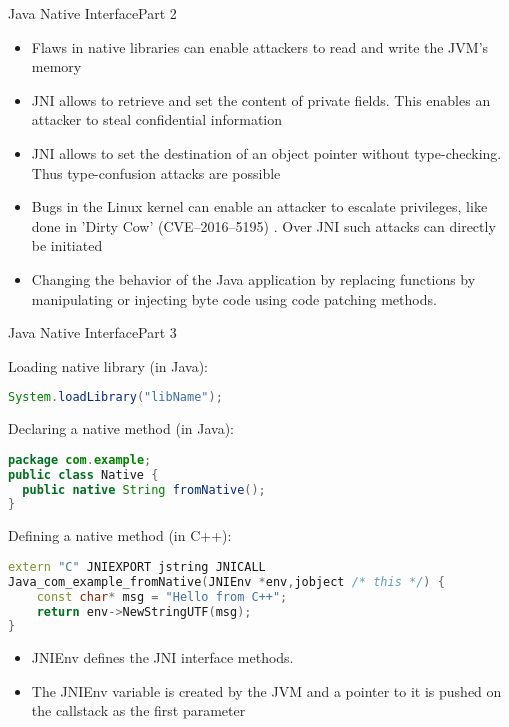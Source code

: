 \begin{frame}{Java Native Interface}{Part 2}
    \begin{itemize}
    \item Flaws in native libraries can enable attackers to read and write the JVM's memory \cite[p. 3]{Sun_jvm-portablesandboxing}
    \item JNI allows to retrieve and set the content of private fields. This enables an attacker to steal confidential information \cite[p. 3]{Sun_jvm-portablesandboxing}
    \item JNI allows to set the destination of an object pointer without type-checking. Thus type-confusion attacks are possible \cite[p. 4]{Sun_jvm-portablesandboxing}
    \item Bugs in the Linux kernel can enable an attacker to escalate privileges, like done in 'Dirty Cow' (CVE--2016--5195) \cite{DirtyCow}. Over JNI such attacks can directly be initiated
    \item Changing the behavior of the Java application by replacing functions by manipulating or injecting byte code using code patching methods.
    \end{itemize}
\end{frame}



\begin{frame}[fragile]{Java Native Interface}{Part 3}

Loading native library (in Java):
\begin{lstlisting}[language=Java, style=JavaCodeStyle]
 System.loadLibrary("libName");
\end{lstlisting}

Declaring a native method (in Java):
\begin{lstlisting}[language=Java, style=JavaCodeStyle]
package com.example;
public class Native {
  public native String fromNative();
}
\end{lstlisting}

Defining a native method (in C++):
\begin{lstlisting}[language=C++, style=CppCodeStyle]
extern "C" JNIEXPORT jstring JNICALL
Java_com_example_fromNative(JNIEnv *env,jobject /* this */) {
    const char* msg = "Hello from C++";
    return env->NewStringUTF(msg);
}
\end{lstlisting}

\begin{itemize}
    \item JNIEnv defines the JNI interface methods.
    \item The JNIEnv variable is created by the JVM and a pointer to it is pushed on the callstack as the first parameter
    \end{itemize}

\end{frame}



